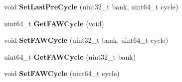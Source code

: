 \begin{DoxyCompactItemize}
\item 
\hypertarget{classMemRankBase_a5af10b120b0e024cef6a604502a73780}{void {\bfseries Set\-Last\-Pre\-Cycle} (uint32\-\_\-t bank, uint64\-\_\-t cycle)}\label{classMemRankBase_a5af10b120b0e024cef6a604502a73780}

\item 
\hypertarget{classMemRankBase_afc20190d248a82987c4807713a0b98ee}{uint64\-\_\-t {\bfseries Get\-F\-A\-W\-Cycle} (void)}\label{classMemRankBase_afc20190d248a82987c4807713a0b98ee}

\item 
\hypertarget{classMemRankBase_aee6e9d1eb430ad2778e4d15a664104e5}{void {\bfseries Set\-F\-A\-W\-Cycle} (uint32\-\_\-t bank, uint64\-\_\-t cycle)}\label{classMemRankBase_aee6e9d1eb430ad2778e4d15a664104e5}

\item 
\hypertarget{classMemRankBase_abaed63f78841d8ff3b17c0d118947869}{uint64\-\_\-t {\bfseries Get\-F\-A\-W\-Cycle} (uint32\-\_\-t bank)}\label{classMemRankBase_abaed63f78841d8ff3b17c0d118947869}

\item 
\hypertarget{classMemRankBase_abbdadf20ed4c1a1ce485feff4bff611f}{void {\bfseries Set\-F\-A\-W\-Cycle} (uint64\-\_\-t cycle)}\label{classMemRankBase_abbdadf20ed4c1a1ce485feff4bff611f}

\end{DoxyCompactItemize}
